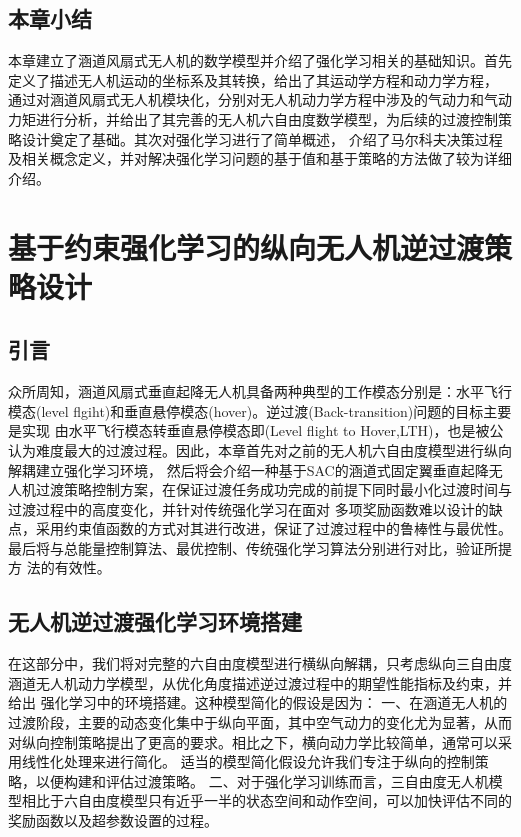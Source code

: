 \section{本章小结}
本章建立了涵道风扇式无人机的数学模型并介绍了强化学习相关的基础知识。首先定义了描述无人机运动的坐标系及其转换，给出了其运动学方程和动力学方程，
通过对涵道风扇式无人机模块化，分别对无人机动力学方程中涉及的气动力和气动力矩进行分析，并给出了其完善的无人机六自由度数学模型，为后续的过渡控制策略设计奠定了基础。其次对强化学习进行了简单概述，
介绍了马尔科夫决策过程及相关概念定义，并对解决强化学习问题的基于值和基于策略的方法做了较为详细介绍。

\chapter{基于约束强化学习的纵向无人机逆过渡策略设计}
\section{引言}
众所周知，涵道风扇式垂直起降无人机具备两种典型的工作模态分别是：水平飞行模态(level flgiht)和垂直悬停模态(hover)。逆过渡(Back-transition)问题的目标主要是实现
由水平飞行模态转垂直悬停模态即(Level flight to Hover,LTH)，也是被公认为难度最大的过渡过程。因此，本章首先对之前的无人机六自由度模型进行纵向解耦建立强化学习环境，
然后将会介绍一种基于SAC的涵道式固定翼垂直起降无人机过渡策略控制方案，在保证过渡任务成功完成的前提下同时最小化过渡时间与过渡过程中的高度变化，并针对传统强化学习在面对
多项奖励函数难以设计的缺点，采用约束值函数的方式对其进行改进，保证了过渡过程中的鲁棒性与最优性。最后将与总能量控制算法、最优控制、传统强化学习算法分别进行对比，验证所提方
法的有效性。
\section{无人机逆过渡强化学习环境搭建}
在这部分中，我们将对完整的六自由度模型进行横纵向解耦，只考虑纵向三自由度涵道无人机动力学模型，从优化角度描述逆过渡过程中的期望性能指标及约束，并给出
强化学习中的环境搭建。这种模型简化的假设是因为：
一、在涵道无人机的过渡阶段，主要的动态变化集中于纵向平面，其中空气动力的变化尤为显著，从而对纵向控制策略提出了更高的要求。相比之下，横向动力学比较简单，通常可以采用线性化处理来进行简化。
适当的模型简化假设允许我们专注于纵向的控制策略，以便构建和评估过渡策略\cite{cheng2022transition,li2020transition}。
二、对于强化学习训练而言，三自由度无人机模型相比于六自由度模型只有近乎一半的状态空间和动作空间，可以加快评估不同的奖励函数以及超参数设置的过程\cite{gaudet2020deep}。
